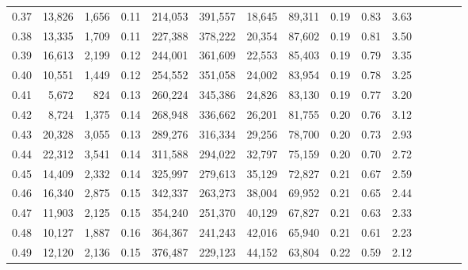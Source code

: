 \begin{tabular}{rrrcrrrrrrrrrrr}
0.37 &  13,826 &  1,656 &                                       0.11 &  214,053 &  391,557 &   18,645 &   89,311 &  0.19 &  0.83 &                         3.63 \\
0.38 &  13,335 &  1,709 &                                       0.11 &  227,388 &  378,222 &   20,354 &   87,602 &  0.19 &  0.81 &                         3.50 \\
0.39 &  16,613 &  2,199 &                                       0.12 &  244,001 &  361,609 &   22,553 &   85,403 &  0.19 &  0.79 &                         3.35 \\
0.40 &  10,551 &  1,449 &                                       0.12 &  254,552 &  351,058 &   24,002 &   83,954 &  0.19 &  0.78 &                         3.25 \\
0.41 &   5,672 &    824 &                                       0.13 &  260,224 &  345,386 &   24,826 &   83,130 &  0.19 &  0.77 &                         3.20 \\
0.42 &   8,724 &  1,375 &                                       0.14 &  268,948 &  336,662 &   26,201 &   81,755 &  0.20 &  0.76 &                         3.12 \\
0.43 &  20,328 &  3,055 &                                       0.13 &  289,276 &  316,334 &   29,256 &   78,700 &  0.20 &  0.73 &                         2.93 \\
0.44 &  22,312 &  3,541 &                                       0.14 &  311,588 &  294,022 &   32,797 &   75,159 &  0.20 &  0.70 &                         2.72 \\
0.45 &  14,409 &  2,332 &                                       0.14 &  325,997 &  279,613 &   35,129 &   72,827 &  0.21 &  0.67 &                         2.59 \\
0.46 &  16,340 &  2,875 &                                       0.15 &  342,337 &  263,273 &   38,004 &   69,952 &  0.21 &  0.65 &                         2.44 \\
0.47 &  11,903 &  2,125 &                                       0.15 &  354,240 &  251,370 &   40,129 &   67,827 &  0.21 &  0.63 &                         2.33 \\
0.48 &  10,127 &  1,887 &                                       0.16 &  364,367 &  241,243 &   42,016 &   65,940 &  0.21 &  0.61 &                         2.23 \\
0.49 &  12,120 &  2,136 &                                       0.15 &  376,487 &  229,123 &   44,152 &   63,804 &  0.22 &  0.59 &                         2.12 \\

\end{tabular}
